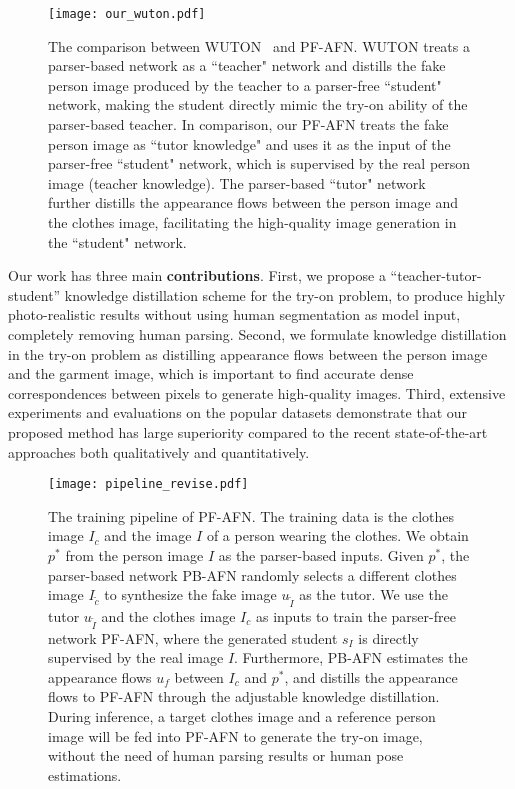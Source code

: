 \documentclass[final]{cvpr}
\begin{document}
	
	\begin{figure}[t]
		\begin{center}
			\texttt{[image: our\_wuton.pdf]}
		\end{center}
		\vspace{-3mm}
		\caption{The comparison between WUTON~\cite{parser_free} and PF-AFN. WUTON treats a parser-based network as a ``teacher" network and distills the fake person image produced by the teacher to a parser-free ``student" network, making the student directly mimic the try-on ability of the parser-based teacher. In comparison, our PF-AFN treats the fake person image as ``tutor knowledge" and uses it as the input of the parser-free ``student" network, which is supervised by the real person image (teacher knowledge). The parser-based ``tutor" network further distills the appearance flows between the person image and the clothes image, facilitating the high-quality image generation in the ``student" network.} 
		\vspace{-10pt}
		\label{fig:our_wuton}
	\end{figure}
	
Our work has three main \textbf{contributions}.
	First, we propose a ``teacher-tutor-student'' knowledge distillation scheme for the try-on problem, to produce highly photo-realistic results without using human segmentation as model input, completely removing human parsing.
Second, we formulate knowledge distillation in the try-on  problem as distilling appearance flows between the person image and the garment image, which is important to find accurate dense correspondences between pixels to generate high-quality images.
	Third, extensive experiments and evaluations on the popular  datasets demonstrate that our proposed method has large superiority compared to the recent state-of-the-art approaches both qualitatively and quantitatively.
	
	\begin{figure*}[t]
		\begin{center}
			\texttt{[image: pipeline\_revise.pdf]}
		\end{center}
		\vspace{-3mm}
		\caption{The training pipeline of PF-AFN. The training data is the clothes image $I_c$ and the image $I$ of a person wearing the clothes. We obtain $p^*$ from the person image $I$ as the parser-based inputs. Given $p^*$, the parser-based network PB-AFN randomly selects a different clothes image $I_{\widetilde{c}}$ to synthesize the fake image ${u}_{\widetilde{I}}$ as the tutor. We use the tutor ${u}_{\widetilde{I}}$ and the clothes image $I_c$ as inputs to train the parser-free network PF-AFN, where the generated student ${s}_I$ is directly supervised by the real image $I$. Furthermore, PB-AFN estimates the appearance flows $u_f$ between $I_c$ and $p^*$, and distills the appearance flows to PF-AFN through the adjustable knowledge distillation. During inference, a target clothes image and a reference person image will be fed into PF-AFN to generate the try-on image, without the need of human parsing results or human pose estimations.}   
		\vspace{-10pt}
		\label{fig:pipeline}
	\end{figure*}
	
\end{document}
